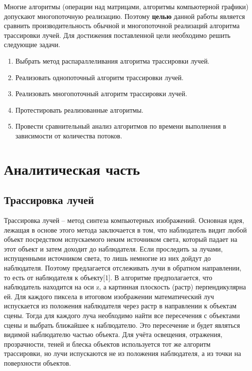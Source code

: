 \documentclass[12pt]{report}
\begin{document}
Многие алгоритмы (операции над матрицами, алгоритмы компьютерной графики) допускают многопоточную реализацию. Поэтому \textbf{целью} данной работы является сравнить производительность обычной и многопоточной реализаций алгоритма трассировки лучей.
Для достижения поставленной цели необходимо решить следующие задачи.
\begin{enumerate}
    \item Выбрать метод распараллеливания алгоритма трассировки лучей.
	\item Реализовать однопоточный алгоритм трассировки лучей.
	\item Реализовать многопоточный алгоритм трассировки лучей.
	\item Протестировать реализованные алгоритмы.
	\item Провести сравнительный анализ алгоритмов по времени выполнения в зависимости от количества потоков.
\end{enumerate}

\chapter{Аналитическая часть}

\section{Трассировка лучей}

Трассировка лучей – метод синтеза компьютерных изображений. Основная идея, лежащая в основе этого метода заключается в том, что наблюдатель видит любой объект посредством испускаемого неким источником света, который  падает на этот объект и затем доходит до наблюдателя. Если проследить за лучами, испущенными источником света, то лишь немногие из них дойдут до наблюдателя. Поэтому предлагается отслеживать лучи в обратном направлении, то есть от наблюдателя к объекту[1]. В алгоритме предполагается, что наблюдатель находится на оси z, а картинная плоскость (растр) перпендикулярна ей. Для каждого пиксела в итоговом изображении математический луч испускается из положения наблюдателя через растр в направлении к объектам сцены. Тогда для каждого луча необходимо найти все пересечения с объектами сцены и выбрать ближайшее к наблюдателю. Это пересечение и будет являться видимой наблюдателю частью объекта. Для учёта освещения, отражения, прозрачности, теней и блеска объектов используется тот же алгоритм трассировки, но лучи испускаются не из положения наблюдателя, а из точки на поверхности объектов. 
\end{document}
